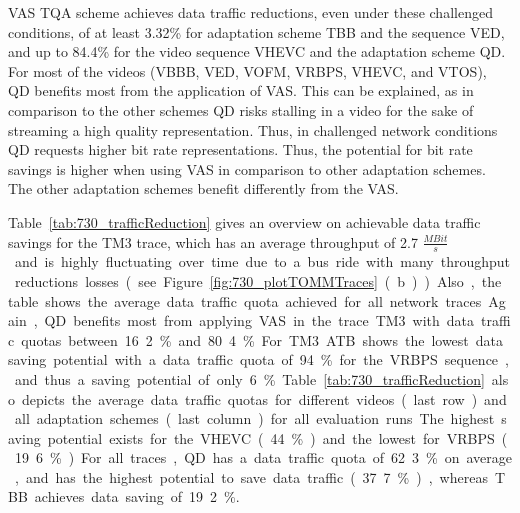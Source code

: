\ac{VAS} \ac{TQA} scheme achieves data traffic reductions, even under these challenged conditions, of at least 3.32\% for adaptation scheme \ac{TBB} and the sequence VED, and up to 84.4\% for the video sequence VHEVC and the adaptation scheme \ac{QD}.
For most of the videos (VBBB, VED, VOFM, VRBPS, VHEVC, and VTOS), \ac{QD} benefits most from the application of \ac{VAS}.
This can be explained, as in comparison to the other schemes \ac{QD} risks stalling in a video for the sake of streaming a high quality representation. 
Thus, in challenged network conditions \ac{QD} requests higher bit rate representations.
Thus, the potential for bit rate savings is higher when using \ac{VAS} in comparison to other adaptation schemes.
The other adaptation schemes benefit differently from the \ac{VAS}.

Table~\ref{tab:730_trafficReduction} gives an overview on achievable data traffic savings for the TM3 trace, which has an average throughput of 2.7 \unit{$\frac{MBit}{s}$} and is highly fluctuating over time due to a bus ride with many throughput reductions losses (see Figure~\ref{fig:730_plotTOMMTraces} (b)).
Also, the table shows the average data traffic quota achieved for all network traces.
Again, \ac{QD} benefits most from applying \ac{VAS} in the trace TM3 with data traffic quotas between 16.2\% and 80.4\%.
For TM3 \ac{ATB} shows the lowest data saving potential with a data traffic quota of 94\% for the VRBPS sequence, and thus a saving potential of only 6\%.
Table~\ref{tab:730_trafficReduction} also depicts the average data traffic quotas for different videos (last row) and all adaptation schemes (last column) for all evaluation runs.
The highest saving potential exists for the VHEVC (44\%) and the lowest for VRBPS (19.6\%).
For all traces, \ac{QD} has a data traffic quota of 62.3\% on average, and has the highest potential to save data traffic (37.7\%), whereas \ac{TBB} achieves data saving of 19.2\%.
